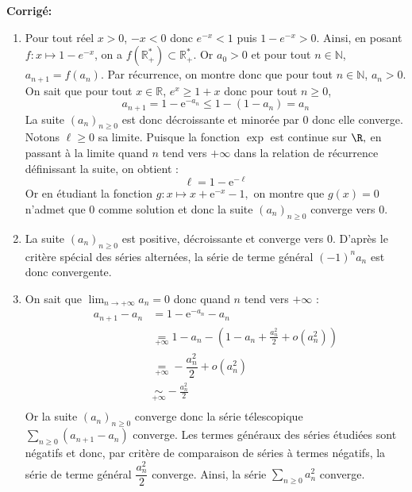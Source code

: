 \documentclass[a4paper,twoside,french,10pt]{VcCours}
\newcommand{\corr}{\textbf{Corrigé:}}
\newcommand{\Sum}[2]{\ensuremath{\textstyle{\sum\limits_{#1}^{#2}}}}
\begin{document}
\corr \begin{enumerate}
\item Pour tout réel $x>0$, $-x<0$ donc $e^{-x}<1$ puis $1-e^{-x}>0$. Ainsi, en posant $f: x \mapsto 1-e^{-x}$, on a $f(\mathbb{R}_+^{*}) \subset \mathbb{R}_+^{*}$. Or $a_0 >0$ et pour tout $n \in \mathbb{N}$, $a_{n+1}=f(a_n)$. Par récurrence, on montre donc que pour tout $n \in \mathbb{N}$, $a_n >0$. On sait que pour tout $x \in \mathbb{R}$, $e^x \geq 1+x$ donc pour tout $n \geq 0$,
 $$a_{n+1}=1- {\mathrm{e}}^{ - a_n } \leq 1-(1-a_n)=a_n$$
La suite $(a_n)_{n \geq 0}$ est donc décroissante et minorée par $0$ donc elle converge. Notons $\ell\geq 0$ sa limite. Puisque la fonction $\exp$ est continue sur $\R,$ en passant \`a la limite quand $n$ tend vers $+\infty$ dans la relation de récurrence définissant la suite, on obtient :
$$\ell= 1 - {\mathrm{e}}^{ - \ell }$$
Or en étudiant la fonction $g : x\longmapsto x+{\mathrm{e}}^{ - x }-1,$ on montre que $g(x)=0$ n'admet que $0$ comme solution et donc la suite $(a_n)_{n \geq 0}$ converge vers $0$.
\item La suite $(a_n)_{n \geq 0}$ est positive, décroissante et converge vers $0$. D'après le critère spécial des séries alternées, la série de terme général $(-1)^n a_n$ est donc convergente. 
\item On sait que $\lim_{n\to+\infty}a_n=0$ donc quand $n$ tend vers $+ \infty$ :
\begin{align*}
a_{n+1}-a_n & = 1 - {\mathrm{e}}^{ - a_n }-a_n \\
&  \underset{+ \infty}{=} 1-a_n-\left(1-a_n+\frac{a_n^2}{2} + o \left(a_n^2\right)\right) \\
& \underset{+ \infty}{=} - \dfrac{a_n^2}{2} + o\left(a_n^2\right)\\
& \underset{+ \infty}{\sim} -\frac{a_n^2}{2} \\
\end{align*}
Or la suite $(a_n)_{n \geq 0}$ converge donc la série télescopique $\Sum{n \geq 0}{} (a_{n+1}-a_n)$ converge. Les termes généraux des séries étudiées sont négatifs et donc, par critère de comparaison de séries à termes négatifs, la série de terme général $\dfrac{a_n^2}{2}$ converge. Ainsi, la série $\Sum{n \geq 0}{} a_n^2$ converge.


\end{enumerate}
\end{document}
